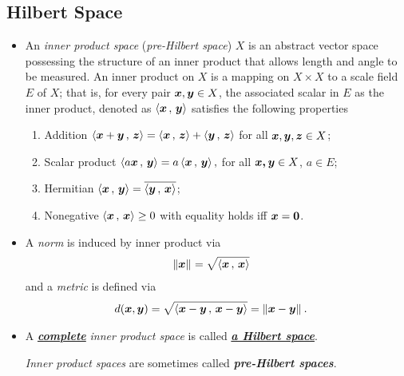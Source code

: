 \documentclass[11pt]{article}
\begin{document}
\subsection{Hilbert Space}
\begin{itemize}
\item \begin{definition}
An \emph{inner product space} (\emph{pre-Hilbert space}) $X$ is an abstract vector space possessing the structure of an inner product that allows length and angle to be measured. An inner product on $X$ is a mapping on $X\times X$ to a scale field $E$ of $X$; that is, for every pair $\boldsymbol{x}, \boldsymbol{y}\in X$, the associated scalar in $E$ as the inner product, denoted as $\left\langle \boldsymbol{x}\,,\, \boldsymbol{y} \right\rangle$ satisfies the following properties
\begin{enumerate}
\item Addition $\left\langle \boldsymbol{x}+ \boldsymbol{y}\,,\, \boldsymbol{z} \right\rangle = \left\langle \boldsymbol{x}\,,\, \boldsymbol{z} \right\rangle + \left\langle \boldsymbol{y}\,,\, \boldsymbol{z} \right\rangle$ for all $\boldsymbol{x},\boldsymbol{y},\boldsymbol{z}\in X$;
\item Scalar product $\left\langle a\boldsymbol{x}\,,\, \boldsymbol{y} \right\rangle = a\left\langle \boldsymbol{x}\,,\, \boldsymbol{y} \right\rangle, $ for all $\boldsymbol{x,y}\in X$, $a\in E$;
\item Hermitian $\left\langle \boldsymbol{x}\,,\, \boldsymbol{y} \right\rangle = \overline{\left\langle \boldsymbol{y}\,,\, \boldsymbol{x} \right\rangle}$; 
\item Nonegative $\left\langle \boldsymbol{x}\,,\, \boldsymbol{x} \right\rangle \ge 0$ with equality holds iff $\boldsymbol{x} = \boldsymbol{0}$.\\
\end{enumerate}
\end{definition}

\item \begin{remark}
A \emph{norm} is induced by inner product via 
\begin{align*}
\left\|\boldsymbol{x}\right\|_{} &= \sqrt{\left\langle \boldsymbol{x}\,,\, \boldsymbol{x} \right\rangle}
\end{align*} 
and a \emph{metric} is defined via 
\begin{align*}
d(\boldsymbol{x}, \boldsymbol{y}) &= \sqrt{\left\langle \boldsymbol{x}- \boldsymbol{y}\,,\, \boldsymbol{x}-\boldsymbol{y} \right\rangle } = \left\|\boldsymbol{x}- \boldsymbol{y}\right\|_{}.
\end{align*}
\end{remark}

\item \begin{definition}
A \underline{\textbf{\emph{complete}}} \emph{inner product space} is called \underline{\emph{\textbf{a Hilbert space}}}. 

\emph{Inner product spaces} are sometimes called \emph{\textbf{pre-Hilbert spaces}}.
\end{definition}


\end{itemize}
\end{document}
